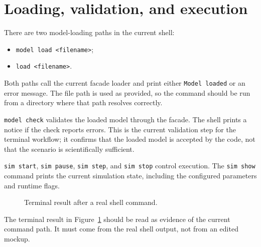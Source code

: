 \section{Loading, validation, and execution}
\label{sec:shell-loading-validation-execution}

There are two model-loading paths in the current shell:
\begin{itemize}
\item \texttt{model load <filename>};
\item \texttt{load <filename>}.
\end{itemize}

Both paths call the current facade loader and print either \texttt{Model loaded}
or an error message. The file path is used as provided, so the command should be
run from a directory where that path resolves correctly.

\texttt{model check} validates the loaded model through the facade. The shell
prints a notice if the check reports errors. This is the current validation
step for the terminal workflow; it confirms that the loaded model is accepted by
the code, not that the scenario is scientifically sufficient.

\texttt{sim start}, \texttt{sim pause}, \texttt{sim step}, and \texttt{sim stop}
control execution. The \texttt{sim show} command prints the current simulation
state, including the configured parameters and runtime flags.

\begin{figure}[htbp]
\centering
\caption{Terminal result after a real shell command.}
\label{fig:shell-terminal-result}
\end{figure}

The terminal result in Figure~\ref{fig:shell-terminal-result} should be read
as evidence of the current command path. It must come from the real shell
output, not from an edited mockup.

